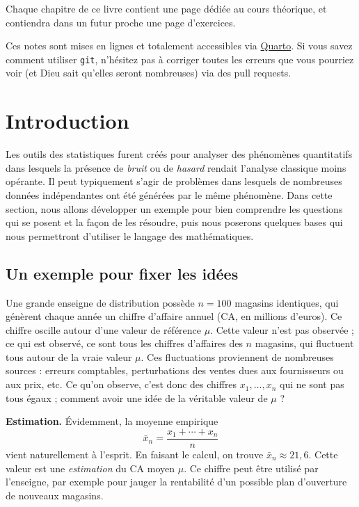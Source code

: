 \documentclass[
  10,
  letterpaper,
  DIV=11,
  numbers=noendperiod]{scrreport}
\theoremstyle{plain}
\theoremstyle{definition}
\theoremstyle{plain}
\theoremstyle{definition}
\theoremstyle{definition}
\theoremstyle{plain}
\theoremstyle{remark}
\begin{document}

Chaque chapitre de ce livre contient une page dédiée au cours théorique,
et contiendra dans un futur proche une page d'exercices.

Ces notes sont mises en lignes et totalement accessibles via
\href{https://quarto.org}{Quarto}. Si vous savez comment utiliser
\texttt{git}, n'hésitez pas à corriger toutes les erreurs que vous
pourriez voir (et Dieu sait qu'elles seront nombreuses) via des pull
requests.


\hypertarget{introduction}{%
\chapter{Introduction}\label{introduction}}

Les outils des statistiques furent créés pour analyser des phénomènes
quantitatifs dans lesquels la présence de \emph{bruit} ou de
\emph{hasard} rendait l'analyse classique moins opérante. Il peut
typiquement s'agir de problèmes dans lesquels de nombreuses données
indépendantes ont été générées par le même phénomène. Dans cette
section, nous allons développer un exemple pour bien comprendre les
questions qui se posent et la façon de les résoudre, puis nous poserons
quelques bases qui nous permettront d'utiliser le langage des
mathématiques.

\hypertarget{un-exemple-pour-fixer-les-iduxe9es}{%
\section{Un exemple pour fixer les
idées}\label{un-exemple-pour-fixer-les-iduxe9es}}

Une grande enseigne de distribution possède \(n=100\) magasins
identiques, qui génèrent chaque année un chiffre d'affaire annuel (CA,
en millions d'euros). Ce chiffre oscille autour d'une valeur de
référence \(\mu\). Cette valeur n'est pas observée ; ce qui est observé,
ce sont tous les chiffres d'affaires des \(n\) magasins, qui fluctuent
tous autour de la vraie valeur \(\mu\). Ces fluctuations proviennent de
nombreuses sources : erreurs comptables, perturbations des ventes dues
aux fournisseurs ou aux prix, etc. Ce qu'on observe, c'est donc des
chiffres \(x_1, \dotsc, x_n\) qui ne sont pas tous égaux ; comment avoir
une idée de la véritable valeur de \(\mu\) ?

\textbf{Estimation.} Évidemment, la moyenne empirique
\[\bar x_n = \frac{x_1+\dotsb + x_n}{n}\] vient naturellement à
l'esprit. En faisant le calcul, on trouve \(\bar{x}_n \approx 21,6\).
Cette valeur est une \emph{estimation} du CA moyen \(\mu\). Ce chiffre
peut être utilisé par l'enseigne, par exemple pour jauger la rentabilité
d'un possible plan d'ouverture de nouveaux magasins.
\end{document}

